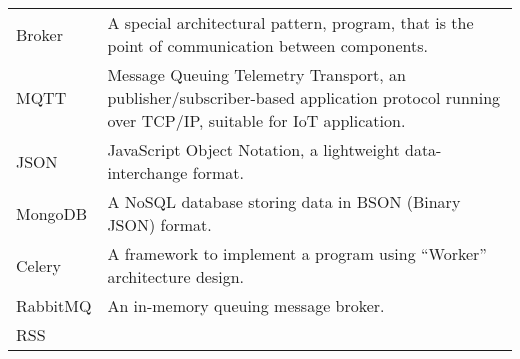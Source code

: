 \begin{longtable}[]{@{}ll@{}}
\begin{minipage}[t]{0.24\columnwidth}\raggedright
Broker\strut
\end{minipage} & \begin{minipage}[t]{0.71\columnwidth}\raggedright
A special architectural pattern, program, that is the point of
communication between components.\strut
\end{minipage}\tabularnewline
\begin{minipage}[t]{0.24\columnwidth}\raggedright
MQTT\strut
\end{minipage} & \begin{minipage}[t]{0.71\columnwidth}\raggedright
Message Queuing Telemetry Transport, an publisher/subscriber-based
application protocol running over TCP/IP, suitable for IoT
application.\strut
\end{minipage}\tabularnewline
\begin{minipage}[t]{0.24\columnwidth}\raggedright
JSON\strut
\end{minipage} & \begin{minipage}[t]{0.71\columnwidth}\raggedright
JavaScript Object Notation, a lightweight data-interchange format.\strut
\end{minipage}\tabularnewline
\begin{minipage}[t]{0.24\columnwidth}\raggedright
MongoDB\strut
\end{minipage} & \begin{minipage}[t]{0.71\columnwidth}\raggedright
A NoSQL database storing data in BSON (Binary JSON) format.\strut
\end{minipage}\tabularnewline
\begin{minipage}[t]{0.24\columnwidth}\raggedright
Celery\strut
\end{minipage} & \begin{minipage}[t]{0.71\columnwidth}\raggedright
A framework to implement a program using ``Worker'' architecture
design.\strut
\end{minipage}\tabularnewline
\begin{minipage}[t]{0.24\columnwidth}\raggedright
RabbitMQ\strut
\end{minipage} & \begin{minipage}[t]{0.71\columnwidth}\raggedright
An in-memory queuing message broker.\strut
\end{minipage}\tabularnewline
\begin{minipage}[t]{0.24\columnwidth}\raggedright
RSS\strut
\end{minipage} & \begin{minipage}[t]{0.71\columnwidth}\raggedright

\end{minipage}
\end{longtable}

